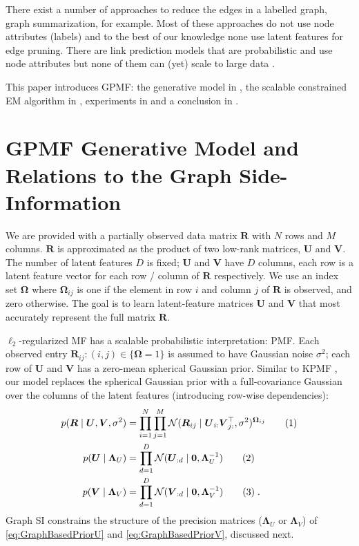\documentclass{article}
\theoremstyle{plain}
\theoremstyle{definition}
\theoremstyle{remark}
\newcommand\numberthis{\addtocounter{equation}{1}\tag{\theequation}}
\def\*#1{\boldsymbol{#1}}
\begin{document}
There exist a number of approaches to reduce the edges in a labelled graph, graph summarization, \citet{liu2018graph} for example. Most of these approaches do not use node attributes (labels) and to the best of our knowledge none use latent features for edge pruning. There are link prediction models that are probabilistic and use node attributes \cite{haghani2017systemic} but none of them can (yet) scale to large data \cite{li2014lrbm,nguyen2012latent,zhao2017leveraging}.

This paper introduces GPMF: the generative model in , the scalable constrained EM algorithm in , experiments in  and a conclusion in .

\section{GPMF Generative Model and Relations to the Graph Side-Information} \label{sec:GenarativeModel}

We are provided with a partially observed data matrix $\*R$ with $N$ rows and $M$ columns. $\*R$ is approximated as the product of two low-rank matrices, $\*U$ and $\*V$. The number of latent features $D$ is fixed; $\*U$ and $\*V$ have $D$ columns, each row is a latent feature vector for each row / column of $\*R$ respectively. We use an index set $\*\Omega$ where $\*\Omega_{ij}$ is one if the element in row $i$ and column $j$ of $\*R$ is observed, and zero otherwise. The goal is to learn latent-feature matrices $\*U$ and $\*V$ that most accurately represent the full matrix $\*R$.

$\ell_2$-regularized MF has a scalable probabilistic interpretation: PMF. Each observed entry $\*R_{ij} : (i,j) \in \{ \*\Omega = 1 \}$ is assumed to have Gaussian noise $\sigma^2$; each row of $\*U$ and $\*V$ has a zero-mean spherical Gaussian prior.  Similar to KPMF \cite{zhou2012kernelized}, our model replaces the spherical Gaussian prior with a full-covariance Gaussian over the columns of the latent features (introducing row-wise dependencies):
\begin{align*}
p(\*R \mid \*U, \*V, \sigma^2) &= \prod_{i=1}^{N} \prod_{j=1}^{M} \mathcal{N} ( \*R_{ij} \mid \*U_{i:} \*V_{j:}^\top, \sigma^2 )^{\*\Omega_{ij}} \numberthis \label{eq:PmfLikelhood}\\
p(\*U \mid \*\Lambda_U) &= \prod_{d=1}^{D} \mathcal{N}(\*U_{:d} \mid \*0, \*\Lambda_U^{-1}) \numberthis \label{eq:GraphBasedPriorU}\\
p(\*V \mid \*\Lambda_V) &= \prod_{d=1}^{D} \mathcal{N}(\*V_{:d} \mid \*0, \*\Lambda_V^{-1}) \numberthis \label{eq:GraphBasedPriorV} \; .
\end{align*}
Graph SI constrains the structure of the precision matrices ($\*\Lambda_U$ or $\*\Lambda_V$) of \eqref{eq:GraphBasedPriorU} and \eqref{eq:GraphBasedPriorV},  discussed next. 
\end{document}
